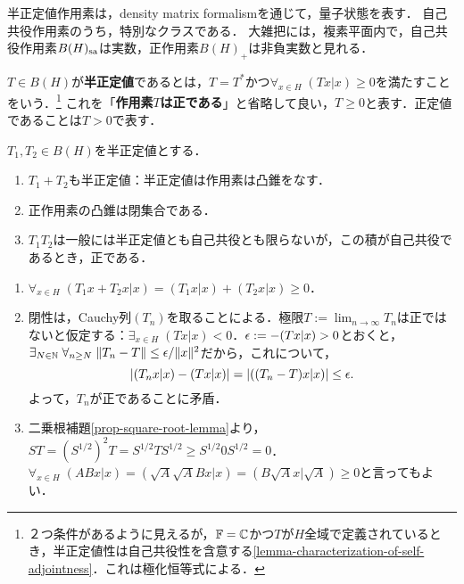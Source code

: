 \documentclass[uplatex,dvipdfmx]{jsreport}
\begin{document}
\begin{tcolorbox}[colframe=ForestGreen, colback=ForestGreen!10!white,breakable,colbacktitle=ForestGreen!40!white,coltitle=black,fonttitle=\bfseries\sffamily,
title=]
    半正定値作用素は，density matrix formalismを通じて，量子状態を表す．
    自己共役作用素のうち，特別なクラスである．
    大雑把には，複素平面内で，自己共役作用素$B(H)_{\mathrm{sa}}$は実数，正作用素$B(H)_+$は非負実数と見れる．
\end{tcolorbox}

\begin{definition}\label{def-positive-operator}
    $T\in B(H)$が\textbf{半正定値}であるとは，$T=T^*$かつ$\forall_{x\in H}\;(Tx|x)\ge 0$を満たすことをいう．\footnote{２つ条件があるように見えるが，$\mathbb{F}=\mathbb{C}$かつ$T$が$H$全域で定義されているとき，半正定値性は自己共役性を含意する\ref{lemma-characterization-of-self-adjointness}．これは極化恒等式による．}
    これを「\textbf{作用素$T$は正である}」と省略して良い，$T\ge 0$と表す．正定値であることは$T>0$で表す．
\end{definition}

\begin{lemma}[正作用素の閉凸錐]\label{lemma-positive-closed-cone-of-positive-operator}
    $T_1,T_2\in B(H)$を半正定値とする．
    \begin{enumerate}
        \item $T_1+T_2$も半正定値：半正定値は作用素は凸錐をなす．
        \item 正作用素の凸錐は閉集合である．
        \item $T_1T_2$は一般には半正定値とも自己共役とも限らないが，この積が自己共役であるとき，正である．
    \end{enumerate}
\end{lemma}
\begin{Proof}\mbox{}
    \begin{enumerate}
        \item $\forall_{x\in H}\;(T_1x+T_2x|x)=(T_1x|x)+(T_2x|x)\ge0$．
        \item 閉性は，Cauchy列$(T_n)$を取ることによる．極限$T:=\lim_{n\to\infty}T_n$は正ではないと仮定する：$\exists_{x\in H}\;(Tx|x)<0$．$\epsilon:=-(Tx|x)>0$とおくと，$\exists_{N\in\mathbb{N}}\;\forall_{n\ge N}\;\|T_n-T\|\le\epsilon/\|x\|^2$だから，これについて，
        \[\left|(T_nx|x)-(Tx|x)\right|=\lvert((T_n-T)x|x)\rvert\le\epsilon.\]
        よって，$T_n$が正であることに矛盾．
        \item 二乗根補題\ref{prop-square-root-lemma}より，$ST=(S^{1/2})^2T=S^{1/2}TS^{1/2}\ge S^{1/2}0S^{1/2}=0$．
        $\forall_{x\in H}\;(ABx|x)=(\sqrt{A}\sqrt{A}Bx|x)=(B\sqrt{A}x|\sqrt{A})\ge0$と言ってもよい．
    \end{enumerate}
\end{Proof}
\end{document}
